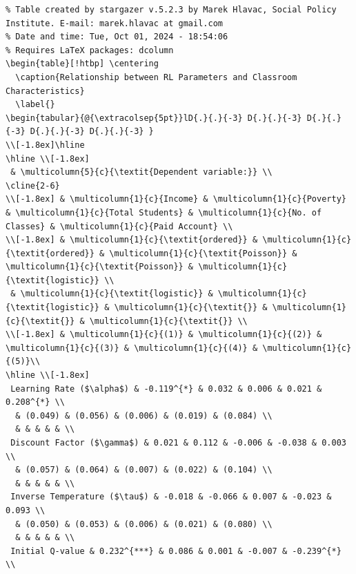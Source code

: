 \documentclass[
  number,
  preprint,
  3p,
  onecolumn]{elsarticle}
\begin{document}
\begin{table}
{\begin{verbatim}
% Table created by stargazer v.5.2.3 by Marek Hlavac, Social Policy Institute. E-mail: marek.hlavac at gmail.com
% Date and time: Tue, Oct 01, 2024 - 18:54:06
% Requires LaTeX packages: dcolumn 
\begin{table}[!htbp] \centering 
  \caption{Relationship between RL Parameters and Classroom Characteristics} 
  \label{} 
\begin{tabular}{@{\extracolsep{5pt}}lD{.}{.}{-3} D{.}{.}{-3} D{.}{.}{-3} D{.}{.}{-3} D{.}{.}{-3} } 
\\[-1.8ex]\hline 
\hline \\[-1.8ex] 
 & \multicolumn{5}{c}{\textit{Dependent variable:}} \\ 
\cline{2-6} 
\\[-1.8ex] & \multicolumn{1}{c}{Income} & \multicolumn{1}{c}{Poverty} & \multicolumn{1}{c}{Total Students} & \multicolumn{1}{c}{No. of Classes} & \multicolumn{1}{c}{Paid Account} \\ 
\\[-1.8ex] & \multicolumn{1}{c}{\textit{ordered}} & \multicolumn{1}{c}{\textit{ordered}} & \multicolumn{1}{c}{\textit{Poisson}} & \multicolumn{1}{c}{\textit{Poisson}} & \multicolumn{1}{c}{\textit{logistic}} \\ 
 & \multicolumn{1}{c}{\textit{logistic}} & \multicolumn{1}{c}{\textit{logistic}} & \multicolumn{1}{c}{\textit{}} & \multicolumn{1}{c}{\textit{}} & \multicolumn{1}{c}{\textit{}} \\ 
\\[-1.8ex] & \multicolumn{1}{c}{(1)} & \multicolumn{1}{c}{(2)} & \multicolumn{1}{c}{(3)} & \multicolumn{1}{c}{(4)} & \multicolumn{1}{c}{(5)}\\ 
\hline \\[-1.8ex] 
 Learning Rate ($\alpha$) & -0.119^{*} & 0.032 & 0.006 & 0.021 & 0.208^{*} \\ 
  & (0.049) & (0.056) & (0.006) & (0.019) & (0.084) \\ 
  & & & & & \\ 
 Discount Factor ($\gamma$) & 0.021 & 0.112 & -0.006 & -0.038 & 0.003 \\ 
  & (0.057) & (0.064) & (0.007) & (0.022) & (0.104) \\ 
  & & & & & \\ 
 Inverse Temperature ($\tau$) & -0.018 & -0.066 & 0.007 & -0.023 & 0.093 \\ 
  & (0.050) & (0.053) & (0.006) & (0.021) & (0.080) \\ 
  & & & & & \\ 
 Initial Q-value & 0.232^{***} & 0.086 & 0.001 & -0.007 & -0.239^{*} \\ 

\end{verbatim}}
\end{table}
\end{document}
